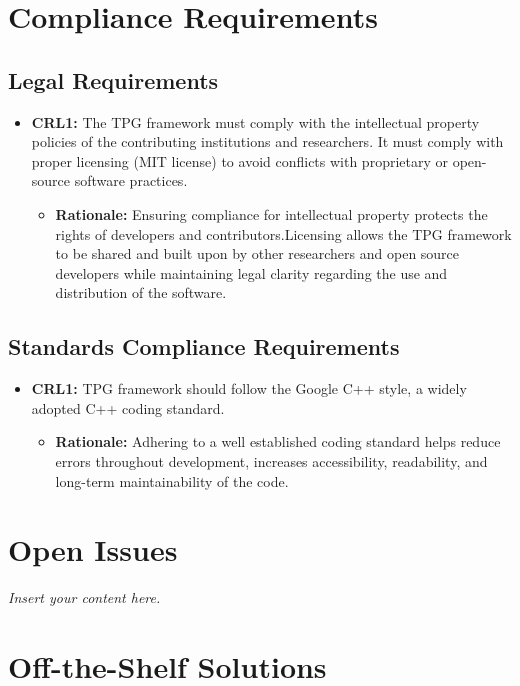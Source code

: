 \documentclass[12pt]{article}
\newcommand{\lips}{\textit{Insert your content here.}}
\begin{document}
\section{Compliance Requirements}
\subsection{Legal Requirements}
\begin{itemize}
  \item \textbf{CRL1:}  The TPG framework must comply with the intellectual property policies of the contributing institutions and researchers. It must comply with proper licensing (MIT license) to avoid conflicts with proprietary or open-source software practices.

      \begin{itemize}
        \item \textbf{Rationale:} Ensuring compliance for intellectual property protects the rights of developers and contributors.Licensing allows the TPG framework to be shared and built upon by other researchers and open source developers while maintaining legal clarity regarding the use and distribution of the software.
      \end{itemize}
\end{itemize}

\subsection{Standards Compliance Requirements}
\begin{itemize}
  \item \textbf{CRL1:}  TPG framework should follow the Google C++ style, a widely adopted C++ coding standard.

      \begin{itemize}
        \item \textbf{Rationale:} Adhering to a well established coding standard helps reduce errors throughout development, increases accessibility, readability, and long-term maintainability of the code.
      \end{itemize}
\end{itemize}
\section{Open Issues}
\lips

\section{Off-the-Shelf Solutions}
\end{document}
